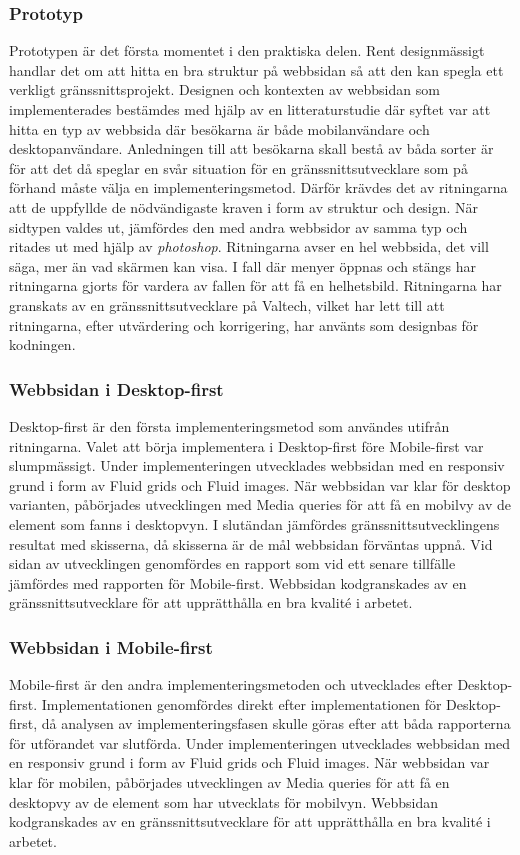 \documentclass[11pt]{article}
\begin{document}
\subsubsection{Prototyp}
Prototypen är det första momentet i den praktiska delen. Rent designmässigt handlar det om att hitta en bra struktur på webbsidan så att den kan spegla ett verkligt gränssnittsprojekt. Designen och kontexten av webbsidan som implementerades bestämdes med hjälp av en litteraturstudie där syftet var att hitta en typ av webbsida där besökarna är både mobilanvändare och desktopanvändare. Anledningen till att besökarna skall bestå av båda sorter är för att det då speglar en svår situation för en gränssnittsutvecklare som på förhand måste välja en implementeringsmetod. Därför krävdes det av ritningarna att de uppfyllde de nödvändigaste kraven i form av struktur och design. När sidtypen valdes ut, jämfördes den med andra webbsidor av samma typ och ritades ut med hjälp av \textit{photoshop}. Ritningarna avser en hel webbsida, det vill säga, mer än vad skärmen kan visa. I fall där menyer öppnas och stängs har ritningarna gjorts för vardera av fallen för att få en helhetsbild. Ritningarna har granskats av en gränssnittsutvecklare på Valtech, vilket har lett till att ritningarna, efter utvärdering och korrigering, har använts som designbas för kodningen.
  
\subsubsection{Webbsidan i Desktop-first}
Desktop-first är den första implementeringsmetod som användes utifrån ritningarna. Valet att börja implementera i Desktop-first före Mobile-first var slumpmässigt. Under implementeringen utvecklades webbsidan med en responsiv grund i form av Fluid grids och Fluid images. När webbsidan var klar för desktop varianten, påbörjades utvecklingen med Media queries för att få en mobilvy av de element som fanns i desktopvyn. I slutändan jämfördes gränssnittsutvecklingens resultat med skisserna, då skisserna är de mål webbsidan förväntas uppnå. Vid sidan av utvecklingen genomfördes en rapport som vid ett senare tillfälle jämfördes med rapporten för Mobile-first. Webbsidan kodgranskades av en gränssnittsutvecklare för att upprätthålla en bra kvalité i arbetet.

\subsubsection{Webbsidan i Mobile-first}
Mobile-first är den andra implementeringsmetoden och utvecklades efter Desktop-first. Implementationen genomfördes direkt efter implementationen för Desktop-first, då analysen av implementeringsfasen skulle göras efter att båda rapporterna för utförandet var slutförda. Under implementeringen utvecklades webbsidan med en responsiv grund i form av Fluid grids och Fluid images. När webbsidan var klar för mobilen, påbörjades utvecklingen av Media queries för att få en desktopvy av de element som har utvecklats för mobilvyn. Webbsidan kodgranskades av en gränssnittsutvecklare för att upprätthålla en bra kvalité i arbetet.
\end{document}
